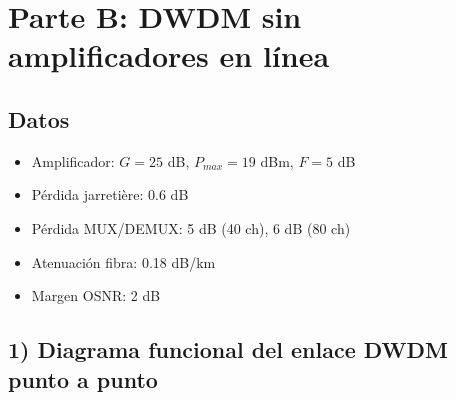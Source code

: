 \documentclass[a4paper,11pt]{article}
\begin{document}
\newpage
\section*{Parte B: DWDM sin amplificadores en línea}

\subsection*{Datos}
\begin{itemize}
    \item Amplificador: $G = 25$ dB, $P_{max} = 19$ dBm, $F = 5$ dB
    \item Pérdida jarretière: 0.6 dB
    \item Pérdida MUX/DEMUX: 5 dB (40 ch), 6 dB (80 ch)
    \item Atenuación fibra: 0.18 dB/km
    \item Margen OSNR: 2 dB
\end{itemize}

\subsection*{1) Diagrama funcional del enlace DWDM punto a punto}
\end{document}
